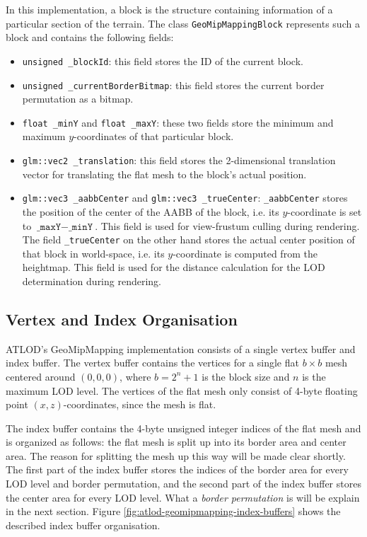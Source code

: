 In this implementation, a block is the structure containing information of a
particular section of the terrain. The class \texttt{GeoMipMappingBlock}
represents such a block and contains the following fields:
\begin{itemize}
  \item \texttt{unsigned \_blockId}: this field stores the ID of the current block.
  \item \texttt{unsigned \_currentBorderBitmap}: this field stores the current border permutation as a bitmap.
  \item \texttt{float \_minY} and \texttt{float \_maxY}: these two fields store the minimum and maximum $y$-coordinates of that particular block.
  \item \texttt{glm::vec2 \_translation}: this field stores the 2-dimensional translation vector for translating the flat mesh to the block's actual position.
  \item \texttt{glm::vec3 \_aabbCenter} and \texttt{glm::vec3 \_trueCenter}: \texttt{\_aabbCenter} stores the position of the center of the AABB of the block, i.e. its $y$-coordinate is set to $\texttt{\_maxY} - \texttt{\_minY}$.
        This field is used for view-frustum culling during rendering.
        The field \texttt{\_trueCenter} on the other hand stores the actual center position of that block in world-space, i.e. its $y$-coordinate is computed from the heightmap. 
        This field is used for the distance calculation for the LOD determination during rendering.
\end{itemize}

\subsection{Vertex and Index Organisation}
ATLOD's GeoMipMapping implementation consists of a single vertex buffer and index buffer.
The vertex buffer contains the vertices for a single flat $b \times b$ mesh centered around $(0,0,0)$, where $b = 2^n + 1$ is the block size and $n$ is the maximum LOD level.
The vertices of the flat mesh only consist of 4-byte floating point $(x,z)$-coordinates, since the mesh is flat.

The index buffer contains the 4-byte unsigned integer indices of the flat mesh and is organized as follows:
the flat mesh is split up into its border area and center area.
The reason for splitting the mesh up this way will be made clear shortly.
The first part of the index buffer stores the indices of the border area
for every LOD level and border permutation, and
the second part of the index buffer stores the center area for every LOD level. 
What a \textit{border permutation} is will be explain in the next section.
Figure \ref{fig:atlod-geomipmapping-index-buffers} shows the described index buffer 
organisation.

